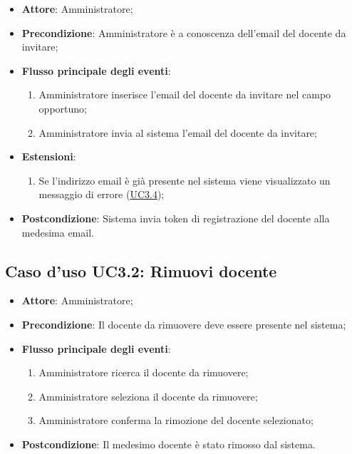 \documentclass[12pt,a4paper]{article}
\begin{document}
\begin{itemize}

\item \textbf{Attore}: Amministratore; 
\item \textbf{Precondizione}: Amministratore è a conoscenza dell’email del docente da invitare;

\item \textbf{Flusso principale degli eventi}:
\begin{enumerate}
	\item Amministratore inserisce l'email del docente da invitare nel campo opportuno;
	\item Amministratore invia al sistema l'email del docente da invitare;
	
\end{enumerate}
\item \textbf{Estensioni}:
\begin{enumerate}
	\item Se l'indirizzo email è già presente nel sistema viene visualizzato un messaggio di errore (\hyperlink{UC3.4}{UC3.4});
	
\end{enumerate}
\item \textbf{Postcondizione}: Sistema invia token di registrazione del docente alla medesima email.
\end{itemize}
\hypertarget{UC3.2}{}
\subsection{Caso d'uso UC3.2: Rimuovi  docente}

\begin{itemize}

\item \textbf{Attore}: Amministratore; 
\item \textbf{Precondizione}: Il docente da rimuovere deve essere presente nel sistema;

\item \textbf{Flusso principale degli eventi}:
\begin{enumerate}
	\item Amministratore ricerca il docente da rimuovere;
	\item Amministratore seleziona il docente da rimuovere;
	\item Amministratore conferma la rimozione del docente selezionato;
	
\end{enumerate}
\item \textbf{Postcondizione}: Il medesimo docente è stato rimosso dal sistema.
\end{itemize}
\hypertarget{UC3.3}{}
\end{document}
